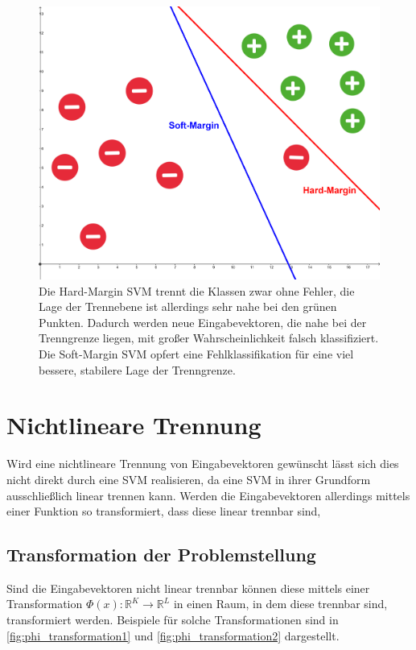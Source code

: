 \documentclass[a4paper,11pt,twoside]{scrreprt}
\begin{document}
\begin{figure}[H]
	\centering
	\includegraphics[width = 13cm]{assets/hard_vs_soft_margin.png}
	\caption{Die Hard-Margin \ac{SVM} trennt die Klassen zwar ohne Fehler, die Lage der Trennebene ist allerdings sehr nahe bei den grünen Punkten. Dadurch werden neue Eingabevektoren, die nahe bei der Trenngrenze liegen, mit großer Wahrscheinlichkeit falsch klassifiziert. Die Soft-Margin SVM \glqq{}opfert\grqq{} eine Fehlklassifikation für eine viel bessere, stabilere Lage der Trenngrenze.}
	\label{fig:hard_vs_soft_svm}
\end{figure}






\section{Nichtlineare Trennung}

Wird eine nichtlineare Trennung von Eingabevektoren gewünscht lässt sich dies nicht direkt durch eine \ac{SVM} realisieren, da eine \ac{SVM} in ihrer Grundform ausschließlich linear trennen kann. Werden die Eingabevektoren allerdings mittels einer Funktion so transformiert, dass diese linear trennbar sind, 

\subsection{Transformation der Problemstellung}

Sind die Eingabevektoren nicht linear trennbar können diese mittels einer Transformation $\Phi(x): \mathbb{R}^{K} \rightarrow \mathbb{R}^{L}$ in einen Raum, in dem diese trennbar sind, transformiert werden. Beispiele für solche Transformationen sind in \autoref{fig:phi_transformation1} und \autoref{fig:phi_transformation2} dargestellt.
\end{document}
